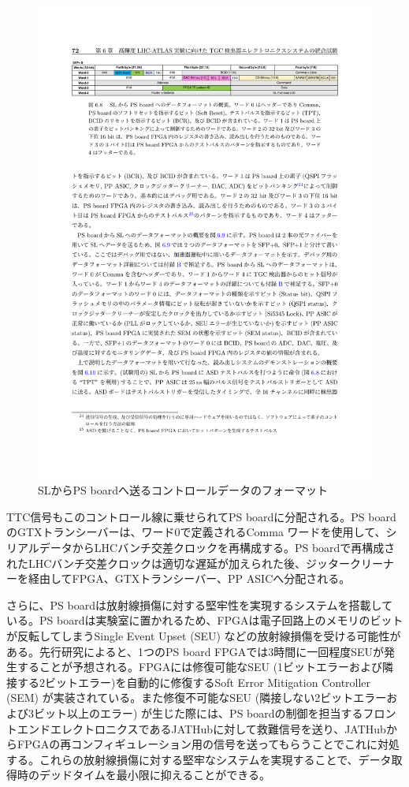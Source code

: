     \begin{figure} 
        \centering
        \includegraphics[width=16cm]{fig/Intro/TGC_PSBdownlink.pdf}
        \caption[SLからPS boardへ送るコントロールデータのフォーマット]{SLからPS boardへ送るコントロールデータのフォーマット\cite{mt_aoki}}
        \label{TGC_PSBdownlink}
    \end{figure}
    
    TTC信号もこのコントロール線に乗せられてPS boardに分配される。PS boardのGTXトランシーバーは、ワード0で定義されるComma ワードを使用して、シリアルデータからLHCバンチ交差クロックを再構成する。PS boardで再構成されたLHCバンチ交差クロックは適切な遅延が加えられた後、ジッタークリーナーを経由してFPGA、GTXトランシーバー、PP ASICへ分配される。    

    さらに、PS boardは放射線損傷に対する堅牢性を実現するシステムを搭載している。PS boardは実験室に置かれるため、FPGAは電子回路上のメモリのビットが反転してしまうSingle Event Upset  (SEU) などの放射線損傷を受ける可能性がある。先行研究\cite{PSB_SEU}によると、1つのPS board FPGAでは3時間に一回程度SEUが発生することが予想される。FPGAには修復可能なSEU  (1ビットエラーおよび隣接する2ビットエラー)を自動的に修復するSoft Error Mitigation Controller  (SEM) が実装されている。また修復不可能なSEU  (隣接しない2ビットエラーおよび3ビット以上のエラー) が生じた際には、PS boardの制御を担当するフロントエンドエレクトロニクスであるJATHubに対して救難信号を送り、JATHubからFPGAの再コンフィギュレーション用の信号を送ってもらうことでこれに対処する。これらの放射線損傷に対する堅牢なシステムを実現することで、データ取得時のデッドタイムを最小限に抑えることができる。

